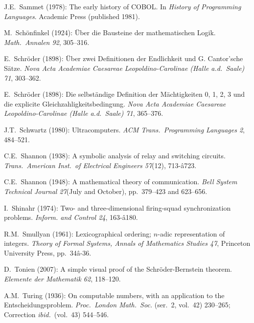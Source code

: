 \begin{thebibliography}{999}

J.E.~Sammet (1978):
The early history of COBOL.  In {\it History of Programming
  Languages}.  Academic Press (published 1981).

M.~Sch\"onfinkel (1924): \"{U}ber die Bausteine der mathematischen
Logik.  {\it Math.~Annalen 92}, 305--316.

E.~Schr\"{o}der (1898): \"{U}ber zwei Definitionen der Endlichkeit und
G. Cantor'sche S\"{a}tze.  {\it Nova Acta Academiae Caesareae
Leopoldino-Carolinae (Halle a.d.~Saale) 71}, 303--362.

E.~Schr\"{o}der (1898): Die selbst\"{a}ndige Definition der
M\"{a}chtigkeiten 0, 1, 2, 3 und die explicite
Gleichzahligkeitsbedingung.  {\it Nova Acta Academiae Caesareae
Leopoldino-Carolinae (Halle a.d.~Saale) 71}, 365--376.

J.T.~Schwartz (1980):
Ultracomputers.
{\it ACM Trans.~Programming Languages 2}, 484--521.

C.E.~Shannon (1938): A symbolic analysis of relay and switching
circuits.  {\it Trans.~American Inst.~of Electrical Engineers 57}(12),
713-â723.

C.E.~Shannon (1948): A mathematical theory of communication.  {\it
  Bell System Technical Journal 27}(July and October), pp.~379--423
and 623--656.

I.~Shinahr (1974): Two- and three-dimensional firing-squad
synchronization problems.  {\it Inform. and Control 24}, 163-â180.

R.M.~Smullyan (1961):  Lexicographical ordering; $n$-adic
representation of integers.  
{\it Theory of Formal Systems, Annals of Mathematics Studies 47},
Princeton University Press, pp.~34â-36.



D.~Tonien (2007):
A simple visual proof of the Schr\"{o}der-Bernstein theorem.
{\it Elemente der Mathematik 62}, 118--120.

A.M.~Turing (1936): On computable numbers, with an application to the
Entscheidungsproblem.  {\it Proc.~London Math.~Soc.} (ser.~2, vol.~42)
230--265; Correction {\it ibid.}~(vol.~43) 544--546.


\end{thebibliography}
